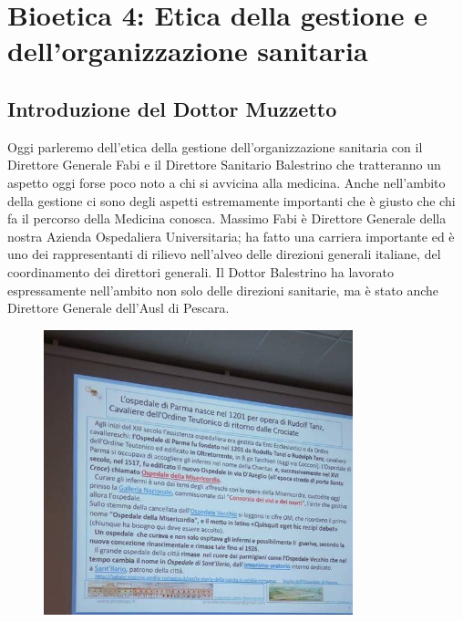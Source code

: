 \section{Bioetica 4: Etica della gestione e dell'organizzazione sanitaria}

\subsection{Introduzione del Dottor Muzzetto}

Oggi parleremo dell'etica della gestione dell'organizzazione sanitaria
con il Direttore Generale Fabi e il Direttore Sanitario Balestrino che
tratteranno un aspetto oggi forse poco noto a chi si avvicina alla
medicina. Anche nell'ambito della gestione ci sono degli aspetti
estremamente importanti che è giusto che chi fa il percorso della
Medicina conosca. Massimo Fabi è Direttore Generale della nostra Azienda
Ospedaliera Universitaria; ha fatto una carriera importante ed è uno dei
rappresentanti di rilievo nell'alveo delle direzioni generali italiane,
del coordinamento dei direttori generali. Il Dottor Balestrino ha
lavorato espressamente nell'ambito non solo delle direzioni sanitarie,
ma è stato anche Direttore Generale dell'Ausl di Pescara.

 \begin{figure}[!ht]
\centering
	\includegraphics[width=0.8\textwidth]{32/image1.jpeg}
	\end{figure}

